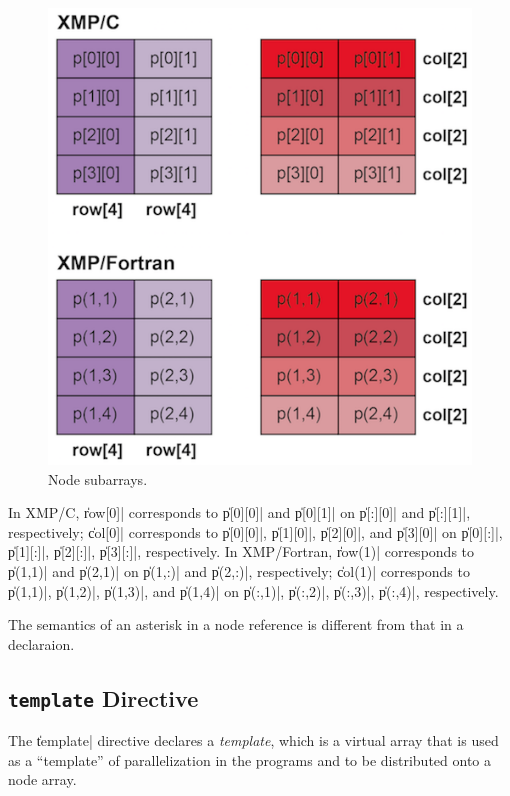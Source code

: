 \begin{figure}
  \centering
  \includegraphics{figs/row_col.png}
  \caption{Node subarrays.}
  \label{fig:partial}
\end{figure}

In XMP/C, \|row[0]| corresponds to \|p[0][0]| and \|p[0][1]| on
\|p[:][0]| and \|p[:][1]|, respectively; 
%
\|col[0]| corresponds to \|p[0][0]|, \|p[1][0]|, \|p[2][0]|, and \|p[3][0]|
on \|p[0][:]|, \|p[1][:]|, \|p[2][:]|, \|p[3][:]|, respectively.
%
In XMP/Fortran, \|row(1)| corresponds to \|p(1,1)| and \|p(2,1)| on
\|p(1,:)| and \|p(2,:)|, respectively;
%
\|col(1)| corresponds to \|p(1,1)|, \|p(1,2)|, \|p(1,3)|, and \|p(1,4)|
on \|p(:,1)|, \|p(:,2)|, \|p(:,3)|, \|p(:,4)|, respectively.

\begin{mynote}
  The semantics of an asterisk in a node reference is different from
  that in a declaraion.
\end{mynote}


\subsection{{\tt template} Directive}

The \|template| directive declares a {\it template}, which is a virtual
array that is used as a ``template'' of parallelization in the programs
and to be distributed onto a node array.

